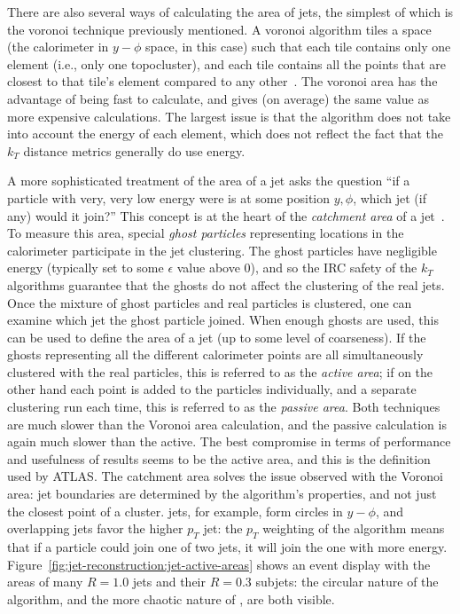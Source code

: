 There are also several ways of calculating the area of jets, the simplest of which is the voronoi technique previously mentioned. A voronoi algorithm tiles a space (the calorimeter in $y-\phi$ space, in this case) such that each tile contains only one element (i.e., only one topocluster), and each tile contains all the points that are closest to that tile's element compared to any other~\cite{catchmentarea}. The voronoi area has the advantage of being fast to calculate, and gives (on average) the same value as more expensive calculations. The largest issue is that the algorithm does not take into account the energy of each element, which does not reflect the fact that the $k_T$ distance metrics generally do use energy.

A more sophisticated treatment of the area of a jet asks the question ``if a particle with very, very low energy were is at some position $y,\phi$, which jet (if any) would it join?'' This concept is at the heart of the \textit{catchment area} of a jet~\cite{catchmentarea}. To measure this area, special \textit{ghost particles} representing locations in the calorimeter participate in the jet clustering. The ghost particles have negligible energy (typically set to some $\epsilon$ value above 0), and so the IRC safety of the $k_T$ algorithms guarantee that the ghosts do not affect the clustering of the real jets. Once the mixture of ghost particles and real particles is clustered, one can examine which jet the ghost particle joined. When enough ghosts are used, this can be used to define the area of a jet (up to some level of coarseness). If the ghosts representing all the different calorimeter points are all simultaneously clustered with the real particles, this is referred to as the \textit{active area}; if on the other hand each point is added to the particles individually, and a separate clustering run each time, this is referred to as the \textit{passive area}. Both techniques are much slower than the Voronoi area calculation, and the passive calculation is again much slower than the active. The best compromise in terms of performance and usefulness of results seems to be the active area, and this is the definition used by ATLAS. The catchment area solves the issue observed with the Voronoi area: jet boundaries are determined by the algorithm's properties, and not just the closest point of a cluster. \Antikt jets, for example, form circles in $y-\phi$, and overlapping jets favor the higher $p_T$ jet: the $p_T$ weighting of the algorithm means that if a particle could join one of two jets, it will join the one with more energy. Figure~\ref{fig:jet-reconstruction:jet-active-areas} shows an event display with the areas of many \antikt $R=1.0$ jets and their \kt $R=0.3$ subjets: the circular nature of the \antikt algorithm, and the more chaotic nature of \kt, are both visible.

